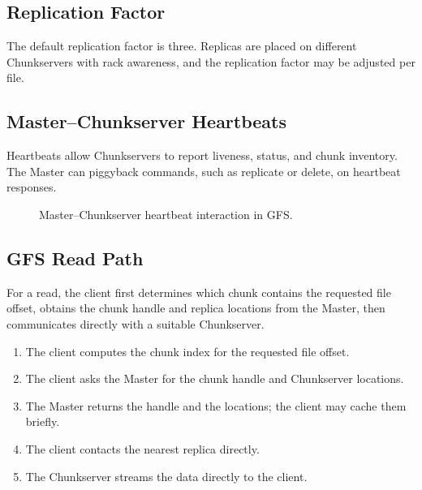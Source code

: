 \documentclass[11pt,a4paper,oneside]{book}
\begin{document}
\subsection{Replication Factor}

The default replication factor is three. Replicas are placed on different Chunkservers with rack awareness, and the replication factor may be adjusted per file.

\subsection{Master--Chunkserver Heartbeats}

Heartbeats allow Chunkservers to report liveness, status, and chunk inventory. The Master can piggyback commands, such as replicate or delete, on heartbeat responses.

\begin{figure}[htbp]
\centering
{}
\caption{Master--Chunkserver heartbeat interaction in GFS.}
\label{fig:gfs-heartbeat}
\end{figure}

\subsection{GFS Read Path}

For a read, the client first determines which chunk contains the requested file offset, obtains the chunk handle and replica locations from the Master, then communicates directly with a suitable Chunkserver.

\begin{enumerate}
    \item The client computes the chunk index for the requested file offset.
    \item The client asks the Master for the chunk handle and Chunkserver locations.
    \item The Master returns the handle and the locations; the client may cache them briefly.
    \item The client contacts the nearest replica directly.
    \item The Chunkserver streams the data directly to the client.
\end{enumerate}
\end{document}

